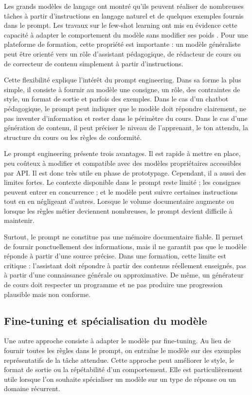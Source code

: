 Les grands modèles de langage ont montré qu'ils peuvent réaliser de nombreuses tâches
à partir d'instructions en langage naturel et de quelques exemples fournis dans le
prompt. Les travaux sur le few-shot learning ont mis en évidence cette capacité à adapter
le comportement du modèle sans modifier ses poids \cite{brown2020language}. Pour une
plateforme de formation, cette propriété est importante : un modèle généraliste peut être
orienté vers un rôle d'assistant pédagogique, de rédacteur de cours ou de correcteur de
contenu simplement à partir d'instructions.

Cette flexibilité explique l'intérêt du prompt engineering. Dans sa forme la plus simple,
il consiste à fournir au modèle une consigne, un rôle, des contraintes de style, un format
de sortie et parfois des exemples. Dans le cas d'un chatbot pédagogique, le prompt peut
indiquer que le modèle doit répondre clairement, ne pas inventer d'information et rester
dans le périmètre du cours. Dans le cas d'une génération de contenu, il peut préciser le
niveau de l'apprenant, le ton attendu, la structure du cours ou les règles de conformité.

Le prompt engineering présente trois avantages. Il est rapide à mettre en place, peu
coûteux à modifier et compatible avec des modèles propriétaires accessibles par API. Il
est donc très utile en phase de prototypage. Cependant, il a aussi des limites fortes. Le
contexte disponible dans le prompt reste limité ; les consignes peuvent entrer en
concurrence ; et le modèle peut suivre certaines instructions tout en en négligeant
d'autres. Lorsque le volume documentaire augmente ou lorsque les règles métier deviennent
nombreuses, le prompt devient difficile à maintenir.

Surtout, le prompt ne constitue pas une mémoire documentaire fiable. Il permet de
fournir ponctuellement des informations, mais il ne garantit pas que le modèle réponde
à partir d'une source précise. Dans une formation, cette limite est critique : l'assistant
doit répondre à partir des contenus réellement enseignés, pas à partir d'une connaissance
générale ou approximative. De même, un générateur de cours doit respecter un programme
et ne pas produire une progression plausible mais non conforme.

\subsection{Fine-tuning et spécialisation du modèle}

Une autre approche consiste à adapter le modèle par fine-tuning. Au lieu de fournir toutes
les règles dans le prompt, on entraîne le modèle sur des exemples représentatifs de la
tâche attendue. Cette approche peut améliorer le style, le format de sortie ou la
répétabilité d'un comportement. Elle est particulièrement utile lorsque l'on souhaite
spécialiser un modèle sur un type de réponse ou un domaine récurrent.

